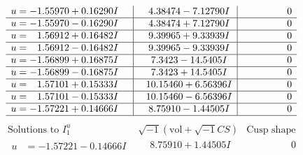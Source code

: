 \documentclass[1p]{elsarticle_modified}
\theoremstyle{definition}
\newcommand{\I}{\sqrt{-1}}
\begin{document}
$$\begin{array}{c|c|c}
\begin{aligned}
u &= -1.55970 + 0.16290 I\end{aligned}
 & \phantom{-}4.38474 - 7.12790 I & \phantom{-0.000000 } 0 \\ \hline\begin{aligned}
u &= -1.55970 - 0.16290 I\end{aligned}
 & \phantom{-}4.38474 + 7.12790 I & \phantom{-0.000000 } 0 \\ \hline\begin{aligned}
u &= \phantom{-}1.56912 + 0.16482 I\end{aligned}
 & \phantom{-}9.39965 + 9.33939 I & \phantom{-0.000000 } 0 \\ \hline\begin{aligned}
u &= \phantom{-}1.56912 - 0.16482 I\end{aligned}
 & \phantom{-}9.39965 - 9.33939 I & \phantom{-0.000000 } 0 \\ \hline\begin{aligned}
u &= -1.56899 + 0.16875 I\end{aligned}
 & \phantom{-}7.3423 - 14.5405 I & \phantom{-0.000000 } 0 \\ \hline\begin{aligned}
u &= -1.56899 - 0.16875 I\end{aligned}
 & \phantom{-}7.3423 + 14.5405 I & \phantom{-0.000000 } 0 \\ \hline\begin{aligned}
u &= \phantom{-}1.57101 + 0.15333 I\end{aligned}
 & \phantom{-}10.15460 + 6.56396 I & \phantom{-0.000000 } 0 \\ \hline\begin{aligned}
u &= \phantom{-}1.57101 - 0.15333 I\end{aligned}
 & \phantom{-}10.15460 - 6.56396 I & \phantom{-0.000000 } 0 \\ \hline\begin{aligned}
u &= -1.57221 + 0.14666 I\end{aligned}
 & \phantom{-}8.75910 - 1.44505 I & \phantom{-0.000000 } 0\\
 \hline 
 \end{array}$$\newpage$$\begin{array}{c|c|c}  
\text{Solutions to }I^u_{1}& \I (\text{vol} + \sqrt{-1}CS) & \text{Cusp shape}\\
 \hline 
\begin{aligned}
u &= -1.57221 - 0.14666 I\end{aligned}
 & \phantom{-}8.75910 + 1.44505 I & \phantom{-0.000000 } 0 \\ \hline\begin{aligned}

\end{aligned}
\end{array}$$
\end{document}
